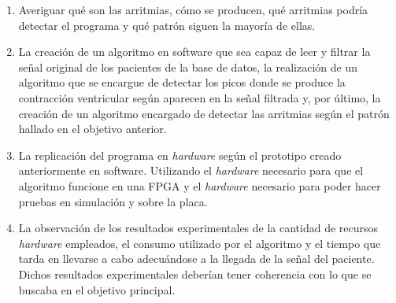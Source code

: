 \begin{enumerate}
    \item Averiguar qué son las arritmias, cómo se producen, qué arritmias podría detectar el programa y qué patrón siguen la mayoría de ellas.
    \item La creación de un algoritmo en software que sea capaz de leer y filtrar la señal original de los pacientes de la base de datos, la realización de un algoritmo que se encargue de detectar los picos donde se produce la contracción ventricular según aparecen en la señal filtrada y, por último, la creación de un algoritmo encargado de detectar las arritmias según el patrón hallado en el objetivo anterior.
    \item La replicación del programa en \textit{hardware} según el prototipo creado anteriormente en software. Utilizando el \textit{hardware} necesario para que el algoritmo funcione en una FPGA y el  \textit{hardware}  necesario para poder hacer pruebas en simulación y sobre la placa.
    \item La observación de los resultados experimentales de la cantidad de recursos \textit{hardware} empleados, el consumo utilizado por el algoritmo y el tiempo que tarda en llevarse a cabo adecuándose a la llegada de la señal del paciente. Dichos resultados experimentales deberían tener coherencia con lo que se buscaba en el objetivo principal.
\end{enumerate}


